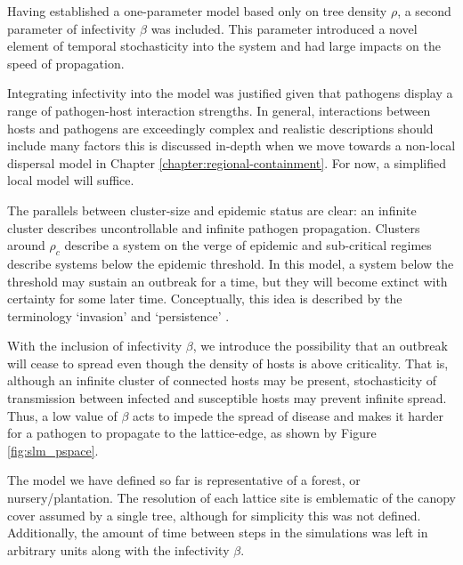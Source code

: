 Having established a one-parameter model based only on tree density $\rho$, a second parameter %
of infectivity $\beta$ was included. %
This parameter introduced a novel element of temporal stochasticity into the system %
and had large impacts on the speed of propagation. %

Integrating infectivity into the model was justified given that pathogens display a range of %
pathogen-host interaction strengths. %
In general, interactions between hosts and pathogens are %
exceedingly complex %
and realistic descriptions should include many factors\textemdash %
this is discussed in-depth when we move towards a non-local dispersal model in Chapter \ref{chapter:regional-containment}. %
For now, a simplified local model will suffice. %


The parallels between cluster-size and epidemic status are clear: %
an infinite cluster describes %
uncontrollable and infinite pathogen propagation. Clusters around $\rho_c$ describe a system %
on the verge of epidemic and sub-critical regimes describe systems below the epidemic threshold. %
In this model, a system below the threshold may sustain an outbreak for a time, but they will %
become extinct with certainty for some later time. %
Conceptually, this idea is described by the terminology `invasion' and `persistence' \cite{gilligan2008epidemiological}. %
 
With the inclusion of infectivity $\beta$, we introduce the possibility that an outbreak will %
cease to spread even though the density of hosts is above criticality. %
That is, although an infinite cluster of connected hosts may be present,  %
stochasticity of transmission between infected and susceptible hosts may prevent infinite spread. %
Thus, a low value of $\beta$ acts to impede the spread of disease and makes it harder for a pathogen %
to propagate to the lattice-edge, as shown by Figure \ref{fig:slm_pspace}. %

The model we have defined %
so far is representative of a forest, or nursery/plantation. %
The resolution of each lattice site is emblematic of the canopy cover assumed by a single tree, %
although for simplicity this was not defined. %
Additionally, the amount of time between steps in the simulations was left in arbitrary units %
along with the infectivity $\beta$. %

